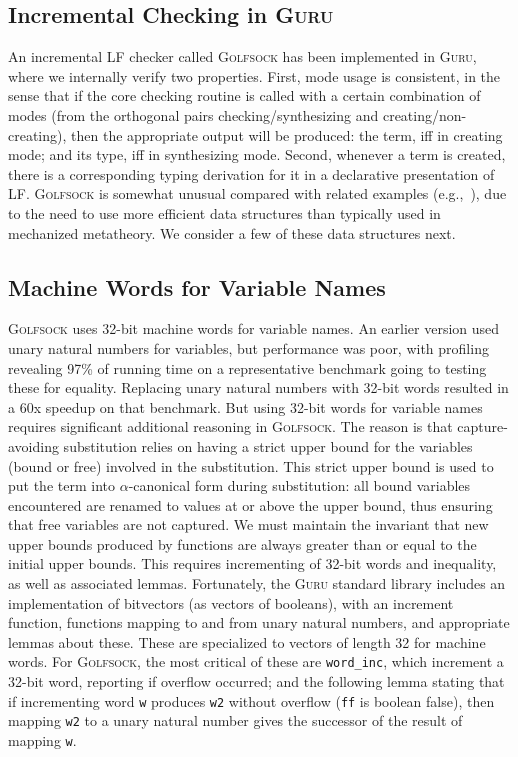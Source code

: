\documentclass[preprint,natbib]{sigplanconf}
\begin{document}
\subsection{Incremental Checking in \textsc{Guru}}

An incremental LF checker called \textsc{Golfsock} has been
implemented in \textsc{Guru}, where we internally verify two
properties.  First, mode usage is consistent, in the sense that if the
core checking routine is called with a certain combination of modes
(from the orthogonal pairs checking/synthesizing and
creating/non-creating), then the appropriate output will be produced:
the term, iff in creating mode; and its type, iff in synthesizing
mode.  Second, whenever a term is created, there is a corresponding
typing derivation for it in a declarative presentation of LF.
\textsc{Golfsock} is somewhat unusual compared with related examples
(e.g.,~\cite{urban+08}), due to the need to use more efficient data
structures than typically used in mechanized metatheory.  We consider
a few of these data structures next.

\subsection{Machine Words for Variable Names}

\textsc{Golfsock} uses 32-bit machine words for variable names.  An
earlier version used unary natural numbers for variables, but
performance was poor, with profiling revealing 97\% of running time on
a representative benchmark going to testing these for equality.
Replacing unary natural numbers with 32-bit words resulted in a 60x
speedup on that benchmark.  But using 32-bit words for variable names
requires significant additional reasoning in \textsc{Golfsock}.  The
reason is that capture-avoiding substitution relies on having a strict
upper bound for the variables (bound or free) involved in the
substitution.  This strict upper bound is used to put the term into
$\alpha$-canonical form during substitution: all bound variables
encountered are renamed to values at or above the upper bound, thus
ensuring that free variables are not captured.  We must maintain the
invariant that new upper bounds produced by functions are always
greater than or equal to the initial upper bounds.  This requires
incrementing of 32-bit words and inequality, as well as associated
lemmas.  Fortunately, the \textsc{Guru} standard library includes an
implementation of bitvectors (as vectors of booleans), with an
increment function, functions mapping to and from unary natural
numbers, and appropriate lemmas about these.  These are specialized to
vectors of length 32 for machine words.  For \textsc{Golfsock}, the
most critical of these are \texttt{word\_inc}, which increment a
32-bit word, reporting if overflow occurred; and the following lemma
stating that if incrementing word \texttt{w} produces \texttt{w2}
without overflow (\texttt{ff} is boolean false), then mapping
\texttt{w2} to a unary natural number gives the successor of the 
result of mapping \texttt{w}.
\end{document}
